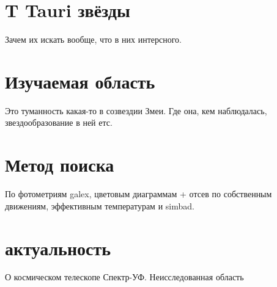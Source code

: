 

\section{T Tauri звёзды}

Зачем их искать вообще, что в них интерсного.

\section{Изучаемая область}

Это туманность какая-то в созвездии Змеи. Где она, кем наблюдалась, звездообразование в ней етс.

\section{Метод поиска}

По фотометриям galex, цветовым диаграммам + отсев по собственным движениям, эффективным температурам и simbad.

\section{актуальность}

О космическом телескопе Спектр-УФ. Неисследованная область